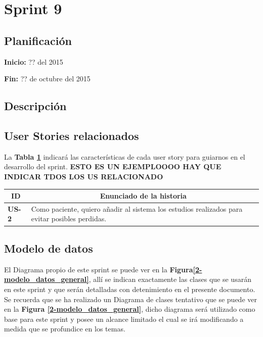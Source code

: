 \documentclass[a4paper,12pt]{article}
\begin{document}

\section{Sprint 9} %

\subsection{Planificación}

\textbf{Inicio: }?? del 2015 

\textbf{Fin:} ?? de octubre del 2015



\subsection{Descripción}

\subsection{User Stories relacionados}
La \textbf{Tabla \ref{US-Sprint9}} indicará las características de cada user story para guiarnos en el desarrollo del sprint.
\textbf{ESTO ES UN EJEMPLOOOO HAY QUE INDICAR TDOS LOS US RELACIONADO}
\begin{table}[h]
    \label{US-Sprint9}
    \centering
	\begin{tabular}{|l|p{9cm}|}
	\hline
        \multicolumn{1}{|c|}{\textbf{ID}} &
        \multicolumn{1}{|c|}{\textbf{Enunciado de la historia}} \\          
    \hline
        \textbf{US-2 } & Como paciente, quiero añadir al sistema los estudios realizados para evitar posibles perdidas.\\
     \hline 
     
    \end{tabular}

\end{table}

\subsection{Modelo de datos}
El Diagrama propio de este sprint se puede ver en la \textbf{Figura\ref{2-modelo_datos_general}}, allí se indican exactamente las clases que se usarán en este sprint y que serán detalladas con detenimiento en el presente documento. Se recuerda que se ha realizado un Diagrama de clases tentativo que se puede ver en la \textbf{Figura \ref{2-modelo_datos_general}}, dicho diagrama  será utilizado como base para este sprint y posee un alcance limitado el cual se irá modificando a medida que se profundice en los temas.
\end{document}

